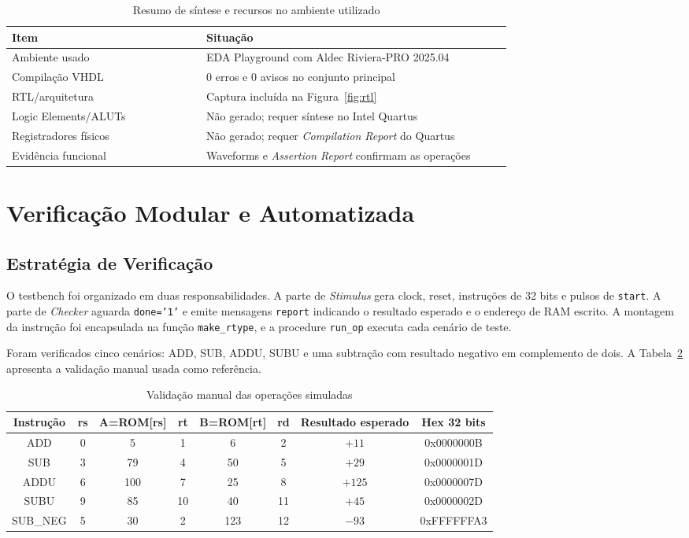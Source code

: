\documentclass[conference]{IEEEtran}
\begin{document}
\begin{table}[!t]
\caption{Resumo de síntese e recursos no ambiente utilizado}
\label{tab:resources}
\centering
\scriptsize
\setlength{\tabcolsep}{3pt}
\begin{tabular}{p{0.35\linewidth} p{0.55\linewidth}}
\toprule
Item & Situação \\
\midrule
Ambiente usado & EDA Playground com Aldec Riviera-PRO 2025.04 \\
Compilação VHDL & 0 erros e 0 avisos no conjunto principal \\
RTL/arquitetura & Captura incluída na Figura~\ref{fig:rtl} \\
Logic Elements/ALUTs & Não gerado; requer síntese no Intel Quartus \\
Registradores físicos & Não gerado; requer \textit{Compilation Report} do Quartus \\
Evidência funcional & Waveforms e \textit{Assertion Report} confirmam as operações \\
\bottomrule
\end{tabular}
\end{table}

\section{Verificação Modular e Automatizada}

\subsection{Estratégia de Verificação}
O testbench foi organizado em duas responsabilidades. A parte de \textit{Stimulus} gera clock, reset, instruções de 32 bits e pulsos de \texttt{start}. A parte de \textit{Checker} aguarda \texttt{done='1'} e emite mensagens \texttt{report} indicando o resultado esperado e o endereço de RAM escrito. A montagem da instrução foi encapsulada na função \texttt{make\_rtype}, e a procedure \texttt{run\_op} executa cada cenário de teste.

Foram verificados cinco cenários: ADD, SUB, ADDU, SUBU e uma subtração com resultado negativo em complemento de dois. A Tabela~\ref{tab:manual} apresenta a validação manual usada como referência.

\begin{table}[!t]
\caption{Validação manual das operações simuladas}
\label{tab:manual}
\centering
\begin{tabular}{c c c c c c c c}
\toprule
Instrução & rs & A=ROM[rs] & rt & B=ROM[rt] & rd & Resultado esperado & Hex 32 bits \\
\midrule
ADD & 0 & 5 & 1 & 6 & 2 & $+11$ & 0x0000000B \\
SUB & 3 & 79 & 4 & 50 & 5 & $+29$ & 0x0000001D \\
ADDU & 6 & 100 & 7 & 25 & 8 & $+125$ & 0x0000007D \\
SUBU & 9 & 85 & 10 & 40 & 11 & $+45$ & 0x0000002D \\
SUB\_NEG & 5 & 30 & 2 & 123 & 12 & $-93$ & 0xFFFFFFA3 \\
\bottomrule
\end{tabular}
\end{table}
\end{document}
